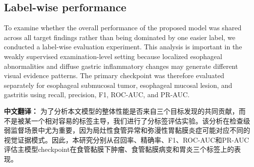 \documentclass[Afour,sagev,times]{sagej}
\begin{document}
\subsection{Label-wise performance}
To examine whether the overall performance of the proposed model was shared across all target findings rather than being dominated by one easier label, we conducted a label-wise evaluation experiment. This analysis is important in the weakly supervised examination-level setting because localized esophageal abnormalities and diffuse gastric inflammatory changes may generate different visual evidence patterns. The primary checkpoint was therefore evaluated separately for esophageal submucosal tumor, esophageal mucosal lesion, and gastritis using recall, precision, F1, ROC-AUC, and PR-AUC.

\textbf{中文翻译：} 为了分析本文模型的整体性能是否来自三个目标发现的共同贡献，而不是被某一个相对容易的标签主导，我们进行了分标签评估实验。该分析在检查级弱监督场景中尤为重要，因为局灶性食管异常和弥漫性胃黏膜炎症可能对应不同的视觉证据模式。因此，本研究分别从召回率、精确率、F1、ROC-AUC和PR-AUC评估主模型checkpoint在食管黏膜下肿瘤、食管黏膜病变和胃炎三个标签上的表现。

\begin{table}[t]
\footnotesize\sf\centering
\caption{Label-wise internal test performance of the proposed model. Values are shown as point estimates with 95\% confidence intervals.\label{T3}}
\end{table}
\end{document}
